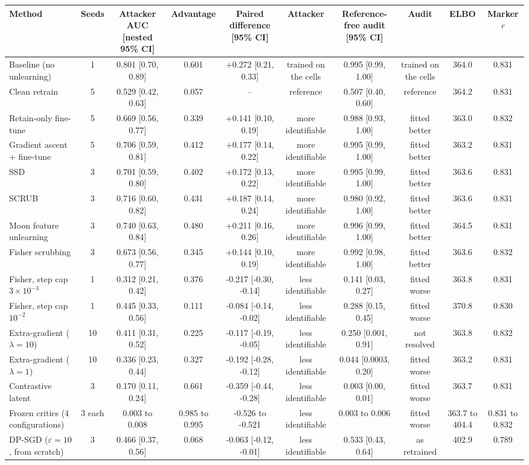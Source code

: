 \begin{tabular}{lccccccccc}
\toprule
Method & Seeds & Attacker AUC [nested 95\% CI] & Advantage & Paired difference [95\% CI] & Attacker & Reference-free audit [95\% CI] & Audit & ELBO & Marker $r$ \\
\midrule
Baseline (no unlearning) & 1 & 0.801 [0.70, 0.89] & 0.601 & +0.272 [0.21, 0.33] & trained on the cells & 0.995 [0.99, 1.00] & trained on the cells & 364.0 & 0.831 \\
Clean retrain & 5 & 0.529 [0.42, 0.63] & 0.057 & -- & reference & 0.507 [0.40, 0.60] & reference & 364.2 & 0.831 \\
\midrule
Retain-only fine-tune & 5 & 0.669 [0.56, 0.77] & 0.339 & +0.141 [0.10, 0.19] & more identifiable & 0.988 [0.93, 1.00] & fitted better & 363.0 & 0.832 \\
Gradient ascent + fine-tune & 5 & 0.706 [0.59, 0.81] & 0.412 & +0.177 [0.14, 0.22] & more identifiable & 0.995 [0.99, 1.00] & fitted better & 363.2 & 0.831 \\
SSD & 3 & 0.701 [0.59, 0.80] & 0.402 & +0.172 [0.13, 0.22] & more identifiable & 0.995 [0.99, 1.00] & fitted better & 363.6 & 0.831 \\
SCRUB & 3 & 0.716 [0.60, 0.82] & 0.431 & +0.187 [0.14, 0.24] & more identifiable & 0.980 [0.92, 1.00] & fitted better & 363.6 & 0.831 \\
Moon feature unlearning & 3 & 0.740 [0.63, 0.84] & 0.480 & +0.211 [0.16, 0.26] & more identifiable & 0.996 [0.99, 1.00] & fitted better & 364.5 & 0.831 \\
Fisher scrubbing & 3 & 0.673 [0.56, 0.77] & 0.345 & +0.144 [0.10, 0.19] & more identifiable & 0.992 [0.98, 1.00] & fitted better & 363.6 & 0.832 \\
Fisher, step cap $3\times 10^{-3}$ & 1 & 0.312 [0.21, 0.42] & 0.376 & -0.217 [-0.30, -0.14] & less identifiable & 0.141 [0.03, 0.27] & fitted worse & 363.8 & 0.831 \\
Fisher, step cap $10^{-2}$ & 1 & 0.445 [0.33, 0.56] & 0.111 & -0.084 [-0.14, -0.02] & less identifiable & 0.288 [0.15, 0.45] & fitted worse & 370.8 & 0.830 \\
Extra-gradient ($\lambda=10$) & 10 & 0.411 [0.31, 0.52] & 0.225 & -0.117 [-0.19, -0.05] & less identifiable & 0.250 [0.001, 0.91] & not resolved & 363.8 & 0.832 \\
Extra-gradient ($\lambda=1$) & 10 & 0.336 [0.23, 0.44] & 0.327 & -0.192 [-0.28, -0.12] & less identifiable & 0.044 [0.0003, 0.20] & fitted worse & 363.2 & 0.831 \\
Contrastive latent & 3 & 0.170 [0.11, 0.24] & 0.661 & -0.359 [-0.44, -0.28] & less identifiable & 0.003 [0.00, 0.01] & fitted worse & 363.7 & 0.831 \\
Frozen critics (4 configurations) & 3 each & 0.003 to 0.008 & 0.985 to 0.995 & -0.526 to -0.521 & less identifiable & 0.003 to 0.006 & fitted worse & 363.7 to 404.4 & 0.831 to 0.832 \\
DP-SGD ($\varepsilon=10$, from scratch) & 3 & 0.466 [0.37, 0.56] & 0.068 & -0.063 [-0.12, -0.01] & less identifiable & 0.533 [0.43, 0.64] & as retrained & 402.9 & 0.789 \\
\bottomrule
\end{tabular}
